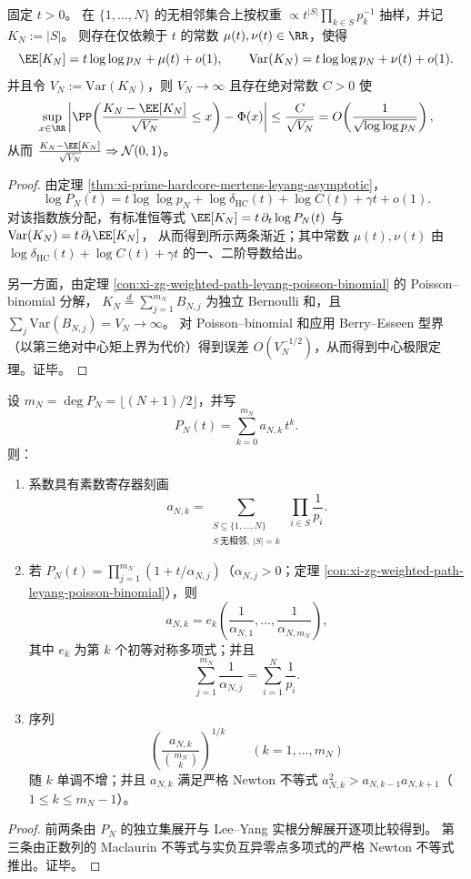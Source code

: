 \begin{theorem}\label{thm:xi-prime-hardcore-gibbs-clt}
固定 \(t>0\)。
在 \(\{1,\dots,N\}\) 的无相邻集合上按权重
\(
\propto t^{|S|}\prod_{k\in S}p_k^{-1}
\)
抽样，并记 \(K_N:=|S|\)。
则存在仅依赖于 \(t\) 的常数 \(\mu(t),\nu(t)\in\RR\)，使得
\[
\EE[K_N]=t\log\log p_N+\mu(t)+o(1),
\qquad
\mathrm{Var}(K_N)=t\log\log p_N+\nu(t)+o(1).
\]
并且令 \(V_N:=\mathrm{Var}(K_N)\)，则 \(V_N\to\infty\) 且存在绝对常数 \(C>0\) 使
\[
\sup_{x\in\RR}\left|
\PP\!\left(\frac{K_N-\EE[K_N]}{\sqrt{V_N}}\le x\right)-\Phi(x)
\right|
\le \frac{C}{\sqrt{V_N}}
=O\!\left(\frac{1}{\sqrt{\log\log p_N}}\right),
\]
从而 \(\frac{K_N-\EE[K_N]}{\sqrt{V_N}}\Rightarrow\mathcal N(0,1)\)。
\end{theorem}
\begin{proof}
由定理 \ref{thm:xi-prime-hardcore-mertens-leyang-asymptotic}，
\[
\log P_N(t)=t\log\log p_N+\log\delta_{\mathrm{HC}}(t)+\log C(t)+\gamma t+o(1).
\]
对该指数族分配，有标准恒等式
\(
\EE[K_N]=t\,\partial_t\log P_N(t)
\)
与
\(
\mathrm{Var}(K_N)=t\,\partial_t\EE[K_N]
\)，
从而得到所示两条渐近；其中常数 \(\mu(t),\nu(t)\) 由 \(\log\delta_{\mathrm{HC}}(t)+\log C(t)+\gamma t\) 的一、二阶导数给出。
\par
另一方面，由定理 \ref{con:xi-zg-weighted-path-leyang-poisson-binomial} 的 Poisson--binomial 分解，
\(
K_N\overset{d}{=}\sum_{j=1}^{m_N}B_{N,j}
\)
为独立 Bernoulli 和，且 \(\sum_j\mathrm{Var}(B_{N,j})=V_N\to\infty\)。
对 Poisson--binomial 和应用 Berry--Esseen 型界（以第三绝对中心矩上界为代价）得到误差 \(O(V_N^{-1/2})\)，从而得到中心极限定理。证毕。
\end{proof}

\begin{proposition}\label{prop:xi-prime-hardcore-newton-maclaurin}
设 \(m_N=\deg P_N=\lfloor(N+1)/2\rfloor\)，并写
\[
P_N(t)=\sum_{k=0}^{m_N}a_{N,k}\,t^k.
\]
则：
\begin{enumerate}
  \item 系数具有素数寄存器刻画
  \[
  a_{N,k}
  =\sum_{\substack{S\subseteq\{1,\dots,N\}\\ S\ \mathrm{无相邻},\ |S|=k}}
  \ \prod_{i\in S}\frac1{p_i}.
  \]
  \item 若 \(P_N(t)=\prod_{j=1}^{m_N}(1+t/\alpha_{N,j})\)（\(\alpha_{N,j}>0\)；定理 \ref{con:xi-zg-weighted-path-leyang-poisson-binomial}），则
  \[
  a_{N,k}=e_k\!\left(\frac{1}{\alpha_{N,1}},\dots,\frac{1}{\alpha_{N,m_N}}\right),
  \]
  其中 \(e_k\) 为第 \(k\) 个初等对称多项式；并且
  \[
  \sum_{j=1}^{m_N}\frac{1}{\alpha_{N,j}}=\sum_{i=1}^{N}\frac{1}{p_i}.
  \]
  \item 序列
  \[
  \left(\frac{a_{N,k}}{\binom{m_N}{k}}\right)^{1/k}\qquad(k=1,\dots,m_N)
  \]
  随 \(k\) 单调不增；并且 \(a_{N,k}\) 满足严格 Newton 不等式 \(a_{N,k}^2>a_{N,k-1}a_{N,k+1}\)（\(1\le k\le m_N-1\)）。
\end{enumerate}
\end{proposition}
\begin{proof}
前两条由 \(P_N\) 的独立集展开与 Lee--Yang 实根分解展开逐项比较得到。
第三条由正数列的 Maclaurin 不等式与实负互异零点多项式的严格 Newton 不等式推出。证毕。
\end{proof}

